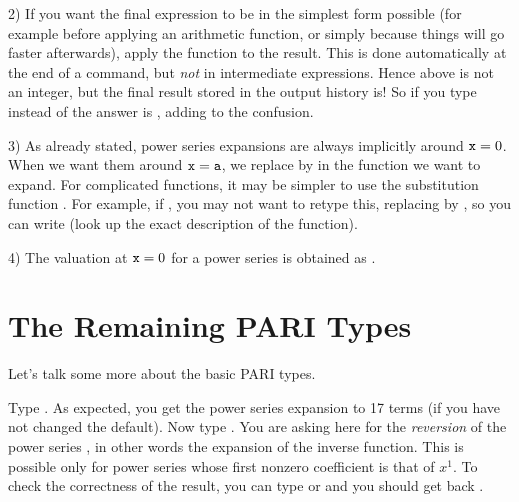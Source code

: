 2) If you want the final expression to be in the simplest form possible (for
example before applying an arithmetic function, or simply because things will
go faster afterwards), apply the function  to the result.
This is done automatically at the end of a  command, but
\emph{not} in intermediate expressions. Hence  above is not an
integer, but the final result stored in the output history is! So
if you type  instead of  the answer is
, adding to the confusion.

3) As already stated, power series expansions are always implicitly around
${\tt x} = 0$. When we want them around ${\tt x} = {\tt a}$, we replace
 by  in the function we want to expand. For complicated
functions, it may be simpler to use the substitution function .
For example, if ,
you may not want to retype this, replacing  by , so you can
write  (look up the exact description of the
 function).

4) The valuation at ${\tt x} = 0$ for a power series  is obtained
as .

\section{The Remaining PARI Types}
Let's talk some more about the basic PARI types.

Type . As expected, you get the power series expansion
to 17 terms (if you have not changed the default). Now type
. You are asking here for the \emph{reversion} of the
power series , in other words the expansion of the inverse function.
This is possible only for power series whose first nonzero coefficient is
that of $x^1$.  To check the correctness of the result, you can type
 or  and you should get back
.

